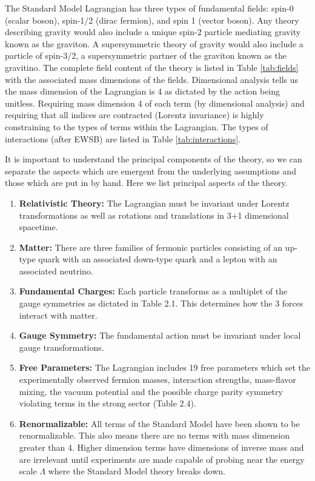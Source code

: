 The Standard Model Lagrangian has three types of fundamental fields: spin-0 (scalar boson), spin-1/2 (dirac fermion), and spin 1 (vector boson). 
Any theory  describing gravity would also include a unique spin-2 particle mediating gravity known
as the graviton. A supersymmetric theory of gravity would also include a particle of spin-3/2,
a supersymmetric partner of the graviton known as the gravitino.  The complete field
content of the theory is listed in Table \ref{tab:fields} with the
associated mass dimensions of the fields. Dimensional analysis tells
us the mass dimension of the Lagrangian is 4 as dictated by the action being unitless. Requiring mass dimension
4 of each term (by dimensional analysis) and requiring that all indices are contracted (Lorentz invariance) 
is highly constraining to the types of terms within the Lagrangian. 
The types of interactions (after EWSB) are listed 
in Table \ref{tab:interactions}. 

It is important to understand the principal components of the theory, so we can separate
 the aspects which are emergent from the underlying assumptions and those which are put in
 by hand. Here we list principal aspects of the theory.

\begin{enumerate}
\item \textbf{Relativistic Theory:} The Lagrangian must be invariant under Lorentz transformations as well as rotations and translations in 3+1 dimensional spacetime. 
\item \textbf{Matter:} There are three families of fermonic particles consisting of an up-type 
quark with an associated down-type quark and a lepton with an associated neutrino.
\item \textbf{Fundamental Charges:} Each particle transforms as a multiplet of the gauge symmetries as dictated in Table 2.1. This  determines how the 3
 forces interact with matter. 
\item \textbf{Gauge Symmetry:} The fundamental action must be invariant under local gauge transformations.
\item \textbf{Free Parameters:} The Lagrangian includes 19 free parameters which set the experimentally observed fermion masses, interaction strengths, mass-flavor mixing, the vacuum potential and the possible charge parity symmetry violating terms in the strong sector
 (Table 2.4). 
\item \textbf{Renormalizable:} All terms of the Standard Model have been shown to be renormalizable. 
 This also means there are no terms with mass dimension greater than 4. Higher
 dimension terms have dimensions of inverse mass and are irrelevant until experiments are made
 capable of probing near the energy scale $\Lambda$ where the Standard Model theory breaks down.
\end{enumerate} 

